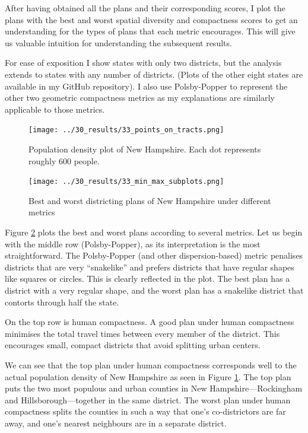 \documentclass[]{article}
\begin{document}
After having obtained all the plans and their corresponding scores, I
plot the plans with the best and worst spatial diversity and compactness
scores to get an understanding for the types of plans that each metric
encourages. This will give us valuable intuition for understanding the
subsequent results.

For ease of exposition I show states with only two districts, but the
analysis extends to states with any number of districts. (Plots of the
other eight states are available in my GitHub repository). I also use
Polsby-Popper to represent the other two geometric compactness metrics
as my explanations are similarly applicable to those metrics.

\begin{figure}
\centering
\texttt{[image: ../30\_results/33\_points\_on\_tracts.png]}
\caption{Population density plot of New Hampshire. Each dot represents
roughly 600 people. \label{nh_density}}
\end{figure}

\begin{figure}
\centering
\texttt{[image: ../30\_results/33\_min\_max\_subplots.png]}
\caption{Best and worst districting plans of New Hampshire under
different metrics \label{nh_minmax}}
\end{figure}

Figure \ref{nh_minmax} plots the best and worst plans according to
several metrics. Let us begin with the middle row (Polsby-Popper), as
its interpretation is the most straightforward. The Polsby-Popper (and
other dispersion-based) metric penalises districts that are very
``snakelike'' and prefers districts that have regular shapes like
squares or circles. This is clearly reflected in the plot. The best plan
has a district with a very regular shape, and the worst plan has a
snakelike district that contorts through half the state.

On the top row is human compactness. A good plan under human compactness
minimises the total travel times between every member of the district.
This encourages small, compact districts that avoid splitting urban
centers.

We can see that the top plan under human compactness corresponds well to
the actual population density of New Hampshire as seen in Figure
\ref{nh_density}. The top plan puts the two most populous and urban
counties in New Hampshire---Rockingham and Hillsborough---together in
the same district. The worst plan under human compactness splits the
counties in such a way that one's co-districtors are far away, and one's
nearest neighbours are in a separate district.
\end{document}
